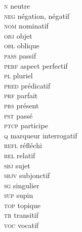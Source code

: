\begin{multicols}{2}
\begin{tabbing}
\textsc{n} \> neutre\\
\textsc{neg} \> négation, négatif\\
\textsc{nom} \> nominatif\\
\textsc{obj} \> objet\\
\textsc{obl} \> oblique\\
\textsc{pass} \> passif\\
\textsc{perf} \> aspect perfectif\\
\textsc{pl} \> pluriel\\
\textsc{pred} \> prédicatif\\
\textsc{prf} \> parfait\\
\textsc{prs} \> présent\\
\textsc{pst} \> passé\\
\textsc{ptcp} \> participe\\
\textsc{q} \> marqueur interrogatif\\
\textsc{refl} \> réfléchi\\
\textsc{rel} \> relatif\\
\textsc{sbj} \> sujet\\
\textsc{sbjv} \> subjonctif\\
\textsc{sg} \> singulier\\
\textsc{sup} \> supin\\
\textsc{top} \> topique\\
\textsc{tr} \> transitif\\
\textsc{voc} \> vocatif\\ 
\end{tabbing}
\end{multicols}